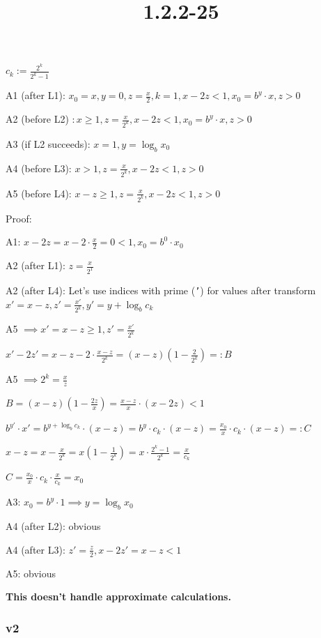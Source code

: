\documentclass{article}
\title{1.2.2-25}
\begin{document}
\maketitle

\( c_k := \frac{2^{k}}{2^{k}-1} \)

A1 (after L1): \( x_0 = x, y = 0, z = \frac{x}{2}, k = 1, x - 2z < 1, x_0 = b^y \cdot x, z > 0 \)

A2 (before L2) \( : x \geq 1, z = \frac{x}{2^k}, x - 2z < 1, x_0 = b^y \cdot x, z > 0 \)

A3 (if L2 succeeds): \( x = 1, y = \log_b{x_0} \)

A4 (before L3): \( x > 1, z = \frac{x}{2^k}, x - 2z < 1, z > 0 \)

A5 (before L4): \( x - z \geq 1, z = \frac{x}{2^k}, x - 2z < 1, z > 0 \)

Proof:

A1: \( x-2z = x - 2\cdot\frac{x}{2} = 0 < 1, x_0 = b^0 \cdot x_0 \)

A2 (after L1): \( z = \frac{x}{2^1} \)

A2 (after L4): Let's use indices with prime (\texttt{'}) for values after transform \( x'=x-z, z'=\frac{x'}{2^k}, y'=y + \log_b{c_k} \)

A5 \( \implies x' = x - z \geq 1, z' = \frac{x'}{2^k} \)

\( x' - 2z'=x-z-2\cdot\frac{x-z}{2^k} = (x-z)(1 - \frac{2}{2^k}) =: B \)

A5 \( \implies 2^k = \frac{x}{z} \)

\( B = (x-z)(1-\frac{2z}{x}) = \frac{x-z}{x}\cdot(x-2z) < 1 \)

\( b^{y'}\cdot x' = b^{y + \log_b{c_k}} \cdot (x-z) = b^y \cdot c_k \cdot (x-z) = \frac{x_0}{x} \cdot c_k \cdot (x-z) =: C \)

\( x - z = x - \frac{x}{2^k} = x(1 - \frac{1}{2^k}) = x \cdot \frac{2^k - 1}{2^k} = \frac{x}{c_k} \)

\( C = \frac{x_0}{x} \cdot c_k \cdot \frac{x}{c_k} = x_0 \)

A3: \( x_0 = b^y\cdot 1 \implies y = \log_{b}{x_0} \)

A4 (after L2): obvious

A4 (after L3): \( z' = \frac{z}{2}, x-2z' = x-z < 1 \)

A5: obvious

\textbf{This doesn't handle approximate calculations.}

\subsubsection*{v2}
\end{document}
